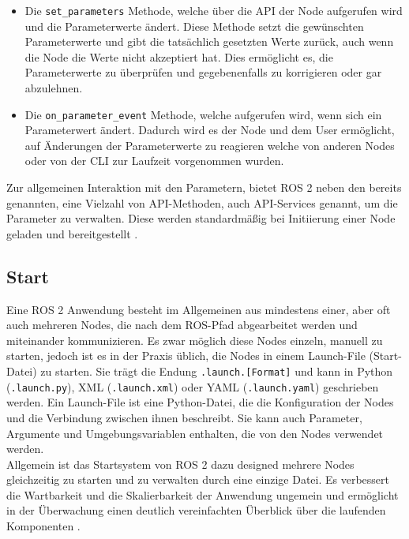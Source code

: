 \begin{itemize}
    \item Die \texttt{set\_parameters} Methode, welche über die \ac{API} der Node aufgerufen wird und die Parameterwerte ändert. Diese Methode setzt die gewünschten Parameterwerte und gibt die tatsächlich gesetzten Werte zurück, auch wenn die Node die Werte nicht akzeptiert hat. Dies ermöglicht es, die Parameterwerte zu überprüfen und gegebenenfalls zu korrigieren oder gar abzulehnen.\\
    \item Die \texttt{on\_parameter\_event} Methode, welche aufgerufen wird, wenn sich ein Parameterwert ändert. Dadurch wird es der Node und dem User ermöglicht, auf Änderungen der Parameterwerte zu reagieren welche von anderen Nodes oder von der \ac{CLI} zur Laufzeit vorgenommen wurden.\\
\end{itemize}
Zur allgemeinen Interaktion mit den Parametern, bietet \ac{ROS} 2 neben den bereits genannten, eine Vielzahl von \ac{API}-Methoden, auch \ac{API}-Services genannt, um die Parameter zu verwalten. Diese werden standardmäßig bei Initiierung einer Node geladen und bereitgestellt \cite{ROSParameters}.\\

\subsection{Start}\label{subsec:ROS2Start}
Eine \ac{ROS} 2 Anwendung besteht im Allgemeinen aus mindestens einer, aber oft auch mehreren Nodes, die nach dem \ac{ROS}-Pfad abgearbeitet werden und miteinander kommunizieren. Es zwar möglich diese Nodes einzeln, manuell zu starten, jedoch ist es in der Praxis üblich, die Nodes in einem Launch-File (Start-Datei) zu starten. Sie trägt die Endung \texttt{.launch.[Format]} und kann in Python (\texttt{.launch.py}), \ac{XML} (\texttt{.launch.xml}) oder \ac{YAML} (\texttt{.launch.yaml}) geschrieben werden. Ein Launch-File ist eine Python-Datei, die die Konfiguration der Nodes und die Verbindung zwischen ihnen beschreibt. Sie kann auch Parameter, Argumente und Umgebungsvariablen enthalten, die von den Nodes verwendet werden.\\
Allgemein ist das Startsystem von \ac{ROS} 2 dazu designed mehrere Nodes gleichzeitig zu starten und zu verwalten durch eine einzige Datei. Es verbessert die Wartbarkeit und die Skalierbarkeit der Anwendung ungemein und ermöglicht in der Überwachung einen deutlich vereinfachten Überblick über die laufenden Komponenten \cite{ROSLaunch}.\\

